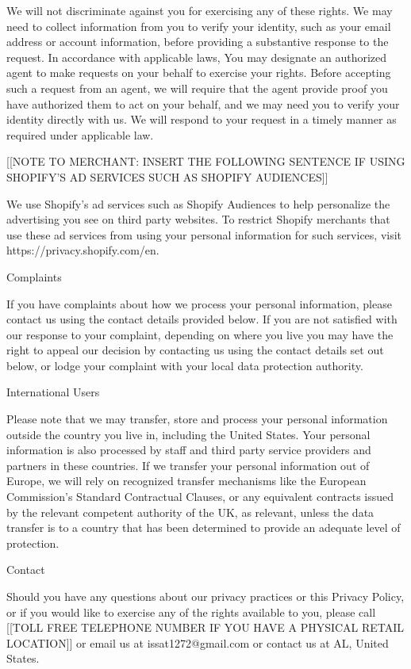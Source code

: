 \documentclass[conference]{IEEEtran}
\begin{document}
We will not discriminate against you for exercising any of these rights. We may need to collect information from you to verify your identity, such as your email address or account information, before providing a substantive response to the request. In accordance with applicable laws, You may designate an authorized agent to make requests on your behalf to exercise your rights. Before accepting such a request from an agent, we will require that the agent provide proof you have authorized them to act on your behalf, and we may need you to verify your identity directly with us. We will respond to your request in a timely manner as required under applicable law.

[[NOTE TO MERCHANT: INSERT THE FOLLOWING SENTENCE IF USING SHOPIFY'S AD SERVICES SUCH AS SHOPIFY AUDIENCES]]

We use Shopify's ad services such as Shopify Audiences to help personalize the advertising you see on third party websites. To restrict Shopify merchants that use these ad services from using your personal information for such services, visit https://privacy.shopify.com/en.

Complaints

If you have complaints about how we process your personal information, please contact us using the contact details provided below. If you are not satisfied with our response to your complaint, depending on where you live you may have the right to appeal our decision by contacting us using the contact details set out below, or lodge your complaint with your local data protection authority.

International Users

Please note that we may transfer, store and process your personal information outside the country you live in, including the United States. Your personal information is also processed by staff and third party service providers and partners in these countries.
If we transfer your personal information out of Europe, we will rely on recognized transfer mechanisms like the European Commission's Standard Contractual Clauses, or any equivalent contracts issued by the relevant competent authority of the UK, as relevant, unless the data transfer is to a country that has been determined to provide an adequate level of protection.

Contact

Should you have any questions about our privacy practices or this Privacy Policy, or if you would like to exercise any of the rights available to you, please call [[TOLL FREE TELEPHONE NUMBER IF YOU HAVE A PHYSICAL RETAIL LOCATION]] or email us at issat1272@gmail.com or contact us at AL, United States.
\end{document}
